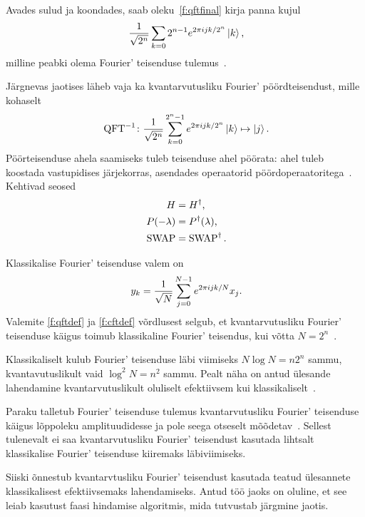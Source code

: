 \documentclass[12pt]{report}
\def\ket#1{\mathinner{|#1\rangle}}
\def\SWAP{\mathop{\mathrm{SWAP}}\nolimits}
\def\QFT{\mathop{\mathrm{QFT}}\nolimits}
\begin{document}
Avades sulud ja koondades, saab oleku~\ref{f:qftfinal} kirja panna kujul
\begin{equation}\label{f:qftfinaltrans}
    \frac{1}{\sqrt{2^n}}\sum_{k=0}2^{n-1}e^{2\pi ijk/2^n}\ket k \rlap{,}
\end{equation}
milline peabki olema Fourier' teisenduse tulemus~\cite{nielsen+chuang, kaye+laflamme+mosca}.

Järgnevas jaotises läheb vaja ka kvantarvutusliku Fourier' pöördteisendust, mille kohaselt
\begin{align}
    \QFT^{-1}\colon
    \frac{1}{\sqrt{2^n}} \sum_{k=0}^{2^n-1} e^{2\pi ijk/2^n} \ket{k} \mapsto \ket{j} \rlap{.}
\end{align}
Pöörteisenduse ahela saamiseks tuleb teisenduse ahel pöörata: ahel tuleb koostada vastupidises järjekorras, asendades operaatorid pöördoperaatoritega~\cite{kaye+laflamme+mosca}.
Kehtivad seosed
\begin{align}\label{f:iqftdef}
    H &= H^{\dagger} \rlap{,} \\
    P(-\lambda) &= P^{\dagger}(\lambda) \rlap{,} \\
    \SWAP &= \SWAP^{\dagger} \rlap{.}
\end{align}

Klassikalise Fourier' teisenduse valem on
\begin{align}\label{f:cftdef}
    y_k = \frac{1}{\sqrt{N}} \sum_{j=0}^{N-1}e^{2\pi ijk/N} x_j \rlap{.}
\end{align}
Valemite \ref{f:qftdef} ja \ref{f:cftdef} võrdlusest selgub, et kvantarvutusliku Fourier' teisenduse käigus toimub klassikaline Fourier' teisendus, kui võtta \(N = 2^n\)~\cite{nielsen+chuang}.

Klassikaliselt kulub Fourier' teisenduse läbi viimiseks \(N \log{N}=n 2^n \) sammu, kvantavutuslikult vaid \(\log^2{N} = n^2\) sammu.
Pealt näha on antud ülesande lahendamine kvantarvutuslikult oluliselt efektiivsem kui klassikaliselt~\cite{nielsen+chuang}.

Paraku talletub Fourier' teisenduse tulemus kvantarvutusliku Fourier' teisenduse käigus lõppoleku amplituudidesse ja pole seega otseselt mõõdetav~\cite{nielnse+chuang}.
Sellest tulenevalt ei saa kvantarvutusliku Fourier' teisendust kasutada lihtsalt klassikalise Fourier' teisenduse kiiremaks läbiviimiseks.


Siiski õnnestub kvantarvtusliku Fourier' teisendust kasutada teatud ülesannete klassikalisest efektiivsemaks lahendamiseks.
Antud töö jaoks on oluline, et see leiab kasutust faasi hindamise algoritmis, mida tutvustab järgmine jaotis.
\end{document}
